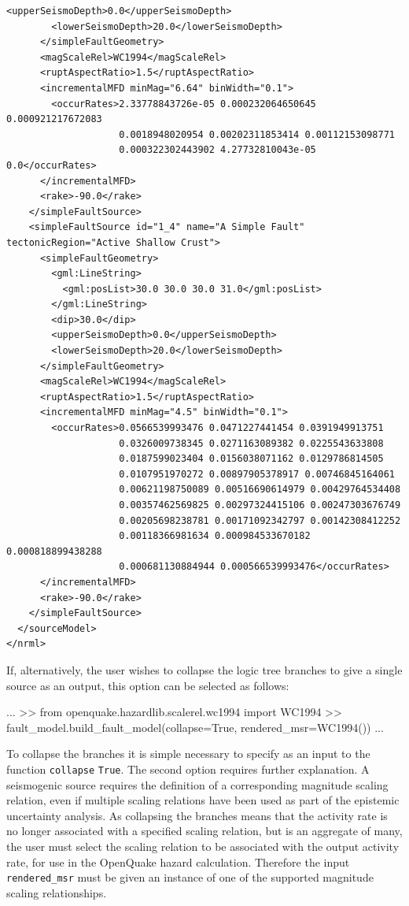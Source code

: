 \begin{Verbatim}[frame=single, commandchars=\\\{\}, fontsize=\scriptsize]
        <upperSeismoDepth>0.0</upperSeismoDepth>
        <lowerSeismoDepth>20.0</lowerSeismoDepth>
      </simpleFaultGeometry>
      <magScaleRel>WC1994</magScaleRel>
      <ruptAspectRatio>1.5</ruptAspectRatio>
      <incrementalMFD minMag="6.64" binWidth="0.1">
        <occurRates>2.33778843726e-05 0.000232064650645 0.000921217672083
                    0.0018948020954 0.00202311853414 0.00112153098771 
                    0.000322302443902 4.27732810043e-05 0.0</occurRates>
      </incrementalMFD>
      <rake>-90.0</rake>
    </simpleFaultSource>
    <simpleFaultSource id="1_4" name="A Simple Fault" tectonicRegion="Active Shallow Crust">
      <simpleFaultGeometry>
        <gml:LineString>
          <gml:posList>30.0 30.0 30.0 31.0</gml:posList>
        </gml:LineString>
        <dip>30.0</dip>
        <upperSeismoDepth>0.0</upperSeismoDepth>
        <lowerSeismoDepth>20.0</lowerSeismoDepth>
      </simpleFaultGeometry>
      <magScaleRel>WC1994</magScaleRel>
      <ruptAspectRatio>1.5</ruptAspectRatio>
      <incrementalMFD minMag="4.5" binWidth="0.1">
        <occurRates>0.0566539993476 0.0471227441454 0.0391949913751
                    0.0326009738345 0.0271163089382 0.0225543633808 
                    0.0187599023404 0.0156038071162 0.0129786814505
                    0.0107951970272 0.00897905378917 0.00746845164061
                    0.00621198750089 0.00516690614979 0.00429764534408
                    0.00357462569825 0.00297324415106 0.00247303676749
                    0.00205698238781 0.00171092342797 0.00142308412252
                    0.00118366981634 0.000984533670182 0.000818899438288
                    0.000681130884944 0.000566539993476</occurRates>
      </incrementalMFD>
      <rake>-90.0</rake>
    </simpleFaultSource>
  </sourceModel>
</nrml>
\end{Verbatim}

If, alternatively, the user wishes to collapse the logic tree branches to give a single source as an output, this option can be selected as follows:

\begin{python}[frame=single]
...
>> from openquake.hazardlib.scalerel.wc1994 import WC1994
>> fault_model.build_fault_model(collapse=True,
                                 rendered_msr=WC1994())
...
\end{python}

To collapse the branches it is simple necessary to specify as an input to the function \verb=collapse= \verb=True=. The second option requires further explanation. A seismogenic source requires the definition of a corresponding magnitude scaling relation, even if multiple scaling relations have been used as part of the epistemic uncertainty analysis. As collapsing the branches means that the activity rate is no longer associated with a specified scaling relation, but is an aggregate of many, the user must select the scaling relation to be associated with the output activity rate, for use in the OpenQuake hazard calculation. Therefore the input \verb=rendered_msr= must be given an instance of one of the supported magnitude scaling relationships.

